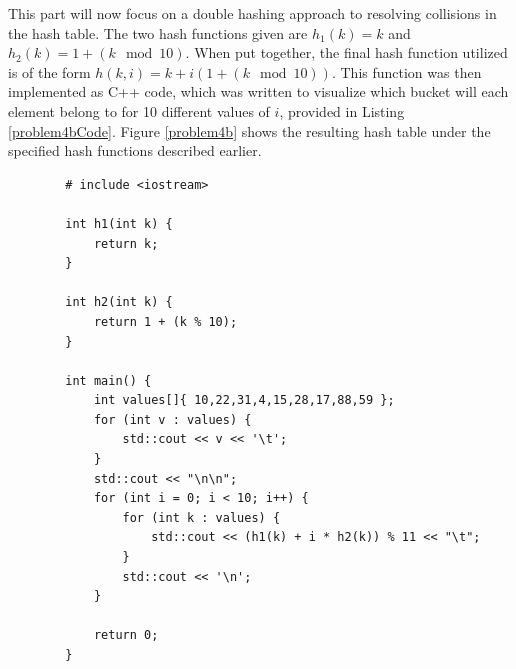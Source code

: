 \documentclass{report}
\begin{document}
This part will now focus on a double hashing approach to resolving collisions in the hash table. The two hash functions given are $h_1(k) = k$ and $h_2(k) = 1 + (k \mod 10)$. When put together, the final hash function utilized is of the form $h(k, i) = k + i(1 + (k\mod10))$.
This function was then implemented as C++ code, which was written to visualize which bucket will each element belong to for 10 different values of $i$, provided in Listing \ref{problem4bCode}. Figure \ref{problem4b} shows the resulting hash table under the specified hash functions described earlier.
\begin{listing}[h]
	\begin{verbatim}
		# include <iostream>
		
		int h1(int k) {
			return k;
		}
		
		int h2(int k) {
			return 1 + (k % 10);
		}
		
		int main() {
			int values[]{ 10,22,31,4,15,28,17,88,59 };
			for (int v : values) {
				std::cout << v << '\t';
			}
			std::cout << "\n\n";
			for (int i = 0; i < 10; i++) {
				for (int k : values) {
					std::cout << (h1(k) + i * h2(k)) % 11 << "\t";
				}
				std::cout << '\n';
			}
			
			return 0;
		}
	\end{verbatim}
	\caption{C++ code to print out the double hashed indices for various $i$.}
	\label{problem4bCode}
\end{listing}
\end{document}
